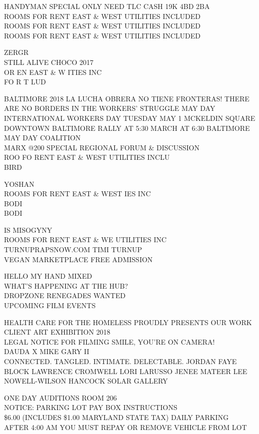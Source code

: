 \documentclass[10pt,letterpaper]{article}
\begin{document}
HANDYMAN SPECIAL ONLY NEED TLC CASH 19K 4BD 2BA\\
ROOMS FOR RENT EAST \& WEST UTILITIES INCLUDED\\
ROOMS FOR RENT EAST \& WEST UTILITIES INCLUDED\\
ROOMS FOR RENT EAST \& WEST UTILITIES INCLUDED

ZERGR\\
STILL ALIVE CHOCO 2017\\
OR EN EAST \& W ITIES INC\\
FO R T LUD

BALTIMORE 2018 LA LUCHA OBRERA NO TIENE FRONTERAS!  THERE ARE NO BORDERS IN THE WORKERS' STRUGGLE MAY DAY INTERNATIONAL WORKERS DAY TUESDAY MAY 1 MCKELDIN SQUARE DOWNTOWN BALTIMORE RALLY AT 5:30 MARCH AT 6:30 BALTIMORE MAY DAY COALITION\\
MARX @200 SPECIAL REGIONAL FORUM \& DISCUSSION\\
ROO FO RENT EAST \& WEST UTILITIES INCLU\\
BIRD

YOSHAN\\
ROOMS FOR RENT EAST \& WEST IES INC\\
BODI\\
BODI

IS MISOGYNY\\
ROOMS FOR RENT EAST \& WE UTILITIES INC\\
TURNUPRAPSNOW.COM TIMI TURNUP\\
VEGAN MARKETPLACE FREE ADMISSION

HELLO MY HAND MIXED\\
WHAT'S HAPPENING AT THE HUB?\\
DROPZONE RENEGADES WANTED\\
UPCOMING FILM EVENTS

HEALTH CARE FOR THE HOMELESS PROUDLY PRESENTS OUR WORK CLIENT ART EXHIBITION 2018\\
LEGAL NOTICE FOR FILMING SMILE, YOU'RE ON CAMERA!\\
DAUDA X MIKE GARY II\\
CONNECTED.  TANGLED.  INTIMATE.  DELECTABLE.  JORDAN FAYE BLOCK LAWRENCE CROMWELL LORI LARUSSO JENEE MATEER LEE NOWELL{-}WILSON HANCOCK SOLAR GALLERY

ONE DAY AUDITIONS ROOM 206\\
NOTICE: PARKING LOT PAY BOX INSTRUCTIONS\\
\$6.00 (INCLUDES \$1.00 MARYLAND STATE TAX) DAILY PARKING AFTER 4:00 AM YOU MUST REPAY OR REMOVE VEHICLE FROM LOT
\end{document}
